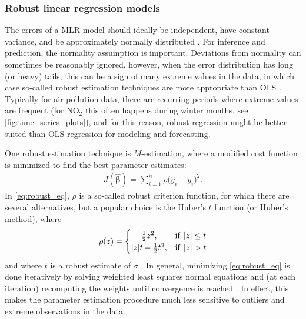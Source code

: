 \subsubsection{Robust linear regression models}
The errors of a MLR model should ideally be independent, have constant variance, and be approximately normally distributed \cite{Montgomery2012}. For inference and prediction, the normality assumption is important. Deviations from normality can sometimes be reasonably ignored, however, when the error distribution has long (or heavy) tails, this can be a sign of many extreme values in the data, in which case so-called robust estimation techniques are more appropriate than OLS \cite{Montgomery2012}. Typically for air pollution data, there are recurring periods where extreme values are frequent (for NO$_2$ this often happens during winter months, see \vref{fig:time_series_plots}), and for this reason, robust regression might be better suited than OLS regression for modeling and forecasting. 

One robust estimation technique is $M$-estimation, where a modified cost function is minimized to find the best parameter estimates:
\begin{align}
J(\bm{\hat{\beta}}) = \sum_{i=1}^{n} \rho \big(\hat{y}_i - y_i \big)^2.
\label{eq:robust_eq} 
\end{align}
In \cref{eq:robust_eq}, $\rho$ is a so-called robust criterion function, for which there are several alternatives, but a popular choice is the Huber's $t$ function (or Huber's method), where 
$$
\rho (z) =  \begin{cases}
\hfil \frac{1}{2}z^2, & \text{if} \:\: |z| \le t \\
|z|t - \frac{1}{2}t^2, & \text{if}\:\: |z| > t
\end{cases}
\label{eq:robust}
$$
and where $t$ is a robust estimate of $\sigma$ \cite{Faraway2020}. In general, minimizing \cref{eq:robust_eq} is done iteratively by solving weighted least squares normal equations and (at each iteration) recomputing the weights until convergence is reached \cite{Montgomery2012}. In effect, this makes the parameter estimation procedure much less sensitive to outliers and extreme observations in the data.



